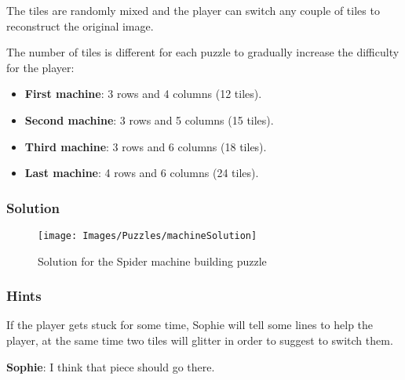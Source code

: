 The tiles are randomly mixed and the player can switch any couple of tiles to reconstruct the original image.

The number of tiles is different for each puzzle to gradually increase the difficulty for the player:
\begin{itemize}
	\item \textbf{First machine}: 3 rows and 4 columns (12 tiles).
	\item \textbf{Second machine}: 3 rows and 5 columns (15 tiles).
	\item \textbf{Third machine}: 3 rows and 6 columns (18 tiles).
	\item \textbf{Last machine}: 4 rows and 6 columns (24 tiles).
\end{itemize}

\subsubsection*{Solution}
\begin{figure}[H]
  \centering
  \texttt{[image: Images/Puzzles/machineSolution]}
  \caption{Solution for the Spider machine building puzzle}
\end{figure}


\subsubsection*{Hints}
If the player gets stuck for some time, Sophie will tell some lines to help the player, at the same time two tiles will glitter in order to suggest to switch them.

\textbf{Sophie}: I think that piece should go there.

